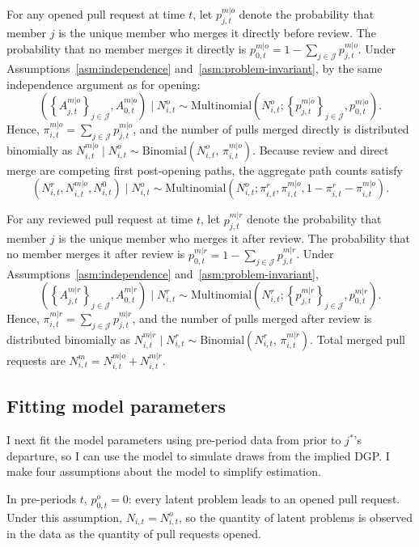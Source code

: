 \documentclass[source/paper/main.tex]{subfiles}
\begin{document}
For any opened pull request at time $t$, let $p_{j,t}^{m|o}$ denote the probability that member $j$ is the unique member who merges it directly before review.
The probability that no member merges it directly is $p_{0,t}^{m|o} = 1-\sum_{j\in\mathcal J} p_{j,t}^{m|o}$.
Under Assumptions~\ref{asm:independence} and~\ref{asm:problem-invariant}, by the same independence argument as for opening:
$$ \left( \left \{A_{j,t}^{m|o}\right \}_{j\in\mathcal J}, A_{0, t}^{m|o} \right) \mid N_{i,t}^o \sim \text{Multinomial}\left(N_{i,t}^o; \left \{p_{j,t}^{m|o}\right \}_{j\in\mathcal J}, p_{0,t}^{m|o} \right). $$
Hence, $\pi_{i,t}^{m|o} = \sum_{j\in\mathcal J}p_{j,t}^{m|o}$, and the number of pulls merged directly is distributed binomially as $N_{i,t}^{m|o} \mid N_{i,t}^o \sim \text{Binomial}(N_{i,t}^o,\, \pi_{i,t}^{m|o})$.
Because review and direct merge are competing first post-opening paths, the aggregate path counts satisfy
$$ (N_{i,t}^r,N_{i,t}^{m|o},N_{i,t}^0) \mid N_{i,t}^o \sim \text{Multinomial}\left(N_{i,t}^o;\pi_{i,t}^r,\pi_{i,t}^{m|o},1-\pi_{i,t}^r-\pi_{i,t}^{m|o}\right). $$

For any reviewed pull request at time $t$, let $p_{j,t}^{m|r}$ denote the probability that member $j$ is the unique member who merges it after review.
The probability that no member merges it after review is $p_{0,t}^{m|r} = 1-\sum_{j\in\mathcal J} p_{j,t}^{m|r}$.
Under Assumptions~\ref{asm:independence} and~\ref{asm:problem-invariant},
$$ \left( \left \{A_{j,t}^{m|r}\right \}_{j\in\mathcal J}, A_{0, t}^{m|r} \right) \mid N_{i,t}^r \sim \text{Multinomial}\left(N_{i,t}^r; \left \{p_{j,t}^{m|r}\right \}_{j\in\mathcal J}, p_{0,t}^{m|r} \right). $$
Hence, $\pi_{i,t}^{m|r} = \sum_{j\in\mathcal J}p_{j,t}^{m|r}$, and the number of pulls merged after review is distributed binomially as $N_{i,t}^{m|r} \mid N_{i,t}^r \sim \text{Binomial}(N_{i,t}^r,\, \pi_{i,t}^{m|r})$.
Total merged pull requests are $N_{i,t}^m=N_{i,t}^{m|o}+N_{i,t}^{m|r}$.

\subsection{Fitting model parameters}

I next fit the model parameters using pre-period data from prior to $j^*$'s departure, so I can use the model to simulate draws from the implied DGP.
I make four assumptions about the model to simplify estimation.

\begin{assumption}
\label{asm:complete-opening}
In pre-periods $t$, $p_{0,t}^o = 0$: every latent problem leads to an opened pull request.
Under this assumption, $N_{i,t} = N_{i,t}^o$, so the quantity of latent problems is observed in the data as the quantity of pull requests opened.
\end{assumption}
\end{document}
